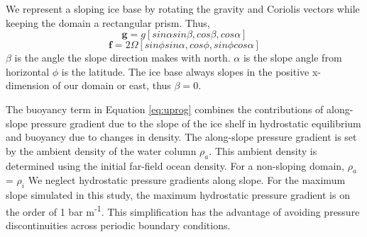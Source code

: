 \documentclass[draft]{styles/agujournal2019}
\begin{document}
We represent a sloping ice base by rotating the gravity and Coriolis vectors while keeping the domain a rectangular prism. 
Thus, 
\begin{equation} \label{eq:g}
	\textbf{g} = g [sin \alpha sin \beta,cos \beta,cos \alpha]
\end{equation}
\begin{equation} \label{eq:f}
    \textbf{f} = 2 \Omega [sin \phi sin \alpha,cos \phi,sin \phi cos \alpha]
\end{equation}
$\beta$ is the angle the slope direction makes with north.
$\alpha$ is the slope angle from horizontal
$\phi$ is the latitude.
The ice base always slopes in the positive x-dimension of our domain or east, thus $\beta = 0$. 

The buoyancy term in Equation \ref{eq:uprog} combines the contributions of along-slope pressure gradient due to the slope of the ice shelf in hydrostatic equilibrium and buoyancy due to changes in density. The along-slope pressure gradient is set by the ambient density of the water column $\rho_a$. This ambient density is determined using the initial far-field ocean density. For a non-sloping domain, $\rho_a$ = $\rho_i$
We neglect hydrostatic pressure gradients along slope. For the maximum slope simulated in this study, the maximum hydrostatic pressure gradient is on the order of 1 bar m\textsuperscript{-1}. %
This simplification has the advantage of avoiding pressure discontinuities across periodic boundary conditions. 
\end{document}
